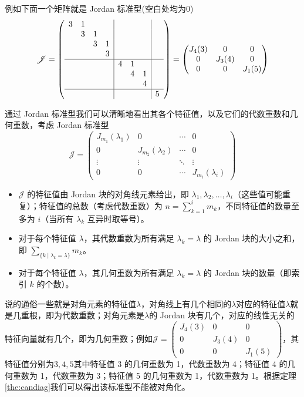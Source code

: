 例如下面一个矩阵就是 Jordan 标准型(空白处均为0)$$\mathscr{J}=\left( \begin{array}{cccc|ccc|c}
 3 & 1 &  &  &  &  &  & \\
  & 3 & 1 &  &  &  &  & \\
  &  & 3 & 1 &  &  &  & \\
  &  &  & 3 &  &  &  & \\ \hline
  &  &  &  & 4 & 1 &  & \\
  &  &  &  &  & 4 & 1 & \\
  &  &  &  &  &  & 4 & \\ \hline
  &  &  &  &  &  &  & 5
\end{array} \right)=\begin{pmatrix}
 J_4(3) & 0 &0 \\
 0 & J_3(4) &0 \\
 0 & 0 & J_1(5)
\end{pmatrix}$$

通过 Jordan 标准型我们可以清晰地看出其各个特征值，以及它们的代数重数和几何重数，考虑 Jordan 标准型 $$\mathscr{J}=\begin{pmatrix}
		J_{m_1}(\lambda_1) & 0 & \cdots & 0\\
		0 & J_{m_2}(\lambda_2) & \cdots &0 \\
		\vdots & \vdots & \ddots & \vdots\\
		0 & 0 & \cdots &J_{m_i}(\lambda_i)
		\end{pmatrix}$$
\begin{itemize}
	\item $\mathscr{J}$ 的特征值由 Jordan 块的对角线元素给出，即 $\lambda_1, \lambda_2, \ldots, \lambda_i$（这些值可能重复）；特征值的总数（考虑代数重数）为 $n = \sum_{k=1}^i m_k$，不同特征值的数量至多为 $i$（当所有 $\lambda_k$ 互异时取等号）。
	\item 对于每个特征值 $\lambda$，其代数重数为所有满足 $\lambda_k = \lambda$ 的 Jordan 块的大小之和，即 $\sum_{\{k \mid \lambda_k = \lambda\}} m_k$。
	\item 对于每个特征值 $\lambda$，其几何重数为所有满足 $\lambda_k = \lambda$ 的 Jordan 块的数量（即索引 $k$ 的个数）。
\end{itemize}
说的通俗一些就是对角元素的特征值$\lambda$，对角线上有几个相同的$\lambda$对应的特征值$\lambda$就是几重根，即为代数重数；对角元素是$\lambda$的 Jordan 块有几个，对应的线性无关的特征向量就有几个，即为几何重数；例如$\mathscr{J}=\begin{pmatrix}
 J_4(3) & 0 &0 \\
 0 & J_3(4) &0 \\
 0 & 0 & J_1(5)
\end{pmatrix}$，其特征值分别为$3,4,5$其中特征值 3 的几何重数为 1，代数重数为 4；特征值 4 的几何重数为 1，代数重数为 3；特征值 5 的几何重数为 1，代数重数为 1。根据定理\ref{the:candiag}我们可以得出该标准型不能被对角化。

